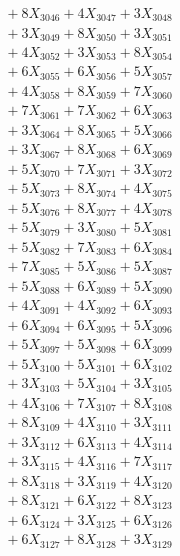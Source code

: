 \documentclass[a4paper,10pt]{article}
\begin{document}
{\begin{align}
&\;  + 8 X_{3046} + 4 X_{3047} + 3 X_{3048} \\[0.3ex]
&\;  + 3 X_{3049} + 8 X_{3050} + 3 X_{3051} \\[0.3ex]
&\;  + 4 X_{3052} + 3 X_{3053} + 8 X_{3054} \\[0.3ex]
&\;  + 6 X_{3055} + 6 X_{3056} + 5 X_{3057} \\[0.3ex]
&\;  + 4 X_{3058} + 8 X_{3059} + 7 X_{3060} \\[0.3ex]
&\;  + 7 X_{3061} + 7 X_{3062} + 6 X_{3063} \\[0.3ex]
&\;  + 3 X_{3064} + 8 X_{3065} + 5 X_{3066} \\[0.3ex]
&\;  + 3 X_{3067} + 8 X_{3068} + 6 X_{3069} \\[0.5ex]\allowbreak
&\;  + 5 X_{3070} + 7 X_{3071} + 3 X_{3072} \\[0.3ex]
&\;  + 5 X_{3073} + 8 X_{3074} + 4 X_{3075} \\[0.3ex]
&\;  + 5 X_{3076} + 8 X_{3077} + 4 X_{3078} \\[0.3ex]
&\;  + 5 X_{3079} + 3 X_{3080} + 5 X_{3081} \\[0.3ex]
&\;  + 5 X_{3082} + 7 X_{3083} + 6 X_{3084} \\[0.3ex]
&\;  + 7 X_{3085} + 5 X_{3086} + 5 X_{3087} \\[0.3ex]
&\;  + 5 X_{3088} + 6 X_{3089} + 5 X_{3090} \\[0.3ex]
&\;  + 4 X_{3091} + 4 X_{3092} + 6 X_{3093} \\[0.3ex]
&\;  + 6 X_{3094} + 6 X_{3095} + 5 X_{3096} \\[0.3ex]
&\;  + 5 X_{3097} + 5 X_{3098} + 6 X_{3099} \\[0.5ex]\allowbreak
&\;  + 5 X_{3100} + 5 X_{3101} + 6 X_{3102} \\[0.3ex]
&\;  + 3 X_{3103} + 5 X_{3104} + 3 X_{3105} \\[0.3ex]
&\;  + 4 X_{3106} + 7 X_{3107} + 8 X_{3108} \\[0.3ex]
&\;  + 8 X_{3109} + 4 X_{3110} + 3 X_{3111} \\[0.3ex]
&\;  + 3 X_{3112} + 6 X_{3113} + 4 X_{3114} \\[0.3ex]
&\;  + 3 X_{3115} + 4 X_{3116} + 7 X_{3117} \\[0.3ex]
&\;  + 8 X_{3118} + 3 X_{3119} + 4 X_{3120} \\[0.3ex]
&\;  + 8 X_{3121} + 6 X_{3122} + 8 X_{3123} \\[0.3ex]
&\;  + 6 X_{3124} + 3 X_{3125} + 6 X_{3126} \\[0.3ex]
&\;  + 6 X_{3127} + 8 X_{3128} + 3 X_{3129} \\[0.5ex]\allowbreak

\end{align}}
\end{document}
